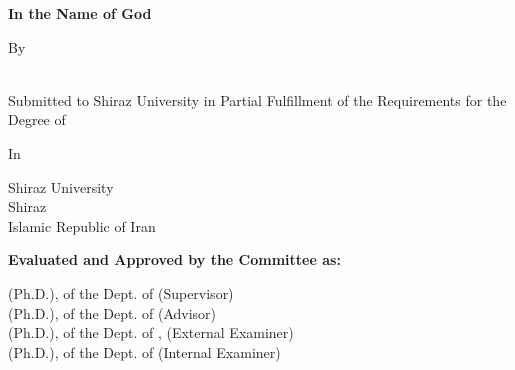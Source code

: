 \begin{latin}
    \begin{center}
        \textbf{In the Name of God}

        \vspace{\baselineskip}
        \textbf{\large \latintitle}

        \vspace{\baselineskip}
        By \\
        \textbf{\large \latinname}

        \vspace{\baselineskip}
        {\latintype} \\
        Submitted to Shiraz University in Partial Fulfillment of the Requirements for the Degree of {\latindegree}

        \vspace{\baselineskip}
        In \\
        {\latinfield}

        \vspace{\baselineskip}
        Shiraz University \\
        Shiraz \\
        Islamic Republic of Iran \\
    \end{center}

    \vspace{\baselineskip}
    \noindent
    \textbf{Evaluated and Approved by the {\latintype} Committee as: {\latingrade}}

    \noindent
    {\latinsupervisor} (Ph.D.), {\latinsupervisortitle} of the Dept. of {\latinsupervisordepartment} (Supervisor) \dotfill \\
    {\latinadvisor} (Ph.D.), {\latinadvisortitle} of the Dept. of {\latinadvisordepartment} (Advisor) \dotfill \\
    {\latinexternalreferee} (Ph.D.), {\latinexternalrefereetitle} of the Dept. of {\latinexternalrefereedepartment}, {\latinexternalrefereeuniversity} (External Examiner) \dotfill \\
    {\latinreferee} (Ph.D.), {\latinrefereetitle} of the Dept. of {\latinrefereedepartment} (Internal Examiner) \dotfill

    \vspace{\baselineskip}
    \centerline{\latindate}
\end{latin}
